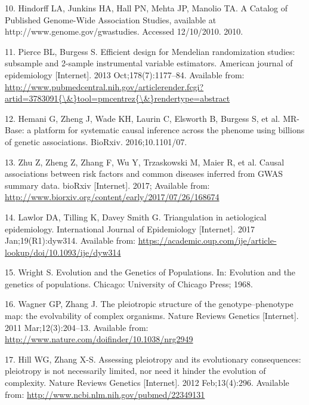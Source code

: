 \documentclass[]{article}
\begin{document}
\hypertarget{ref-Hindorff2010}{}
10. Hindorff LA, Junkins HA, Hall PN, Mehta JP, Manolio TA. A Catalog of
Published Genome-Wide Association Studies, available at
http://www.genome.gov/gwastudies. Accessed 12/10/2010. 2010.

\hypertarget{ref-Pierce2013}{}
11. Pierce BL, Burgess S. Efficient design for Mendelian randomization
studies: subsample and 2-sample instrumental variable estimators.
American journal of epidemiology {[}Internet{]}. 2013
Oct;178(7):1177--84. Available from:
\href{http://www.pubmedcentral.nih.gov/articlerender.fcgi?artid=3783091\%7B/\&\%7Dtool=pmcentrez\%7B/\&\%7Drendertype=abstract}{http://www.pubmedcentral.nih.gov/articlerender.fcgi?artid=3783091\{\textbackslash{}\&\}tool=pmcentrez\{\textbackslash{}\&\}rendertype=abstract}

\hypertarget{ref-Hemani2016}{}
12. Hemani G, Zheng J, Wade KH, Laurin C, Elsworth B, Burgess S, et al.
MR-Base: a platform for systematic causal inference across the phenome
using billions of genetic associations. BioRxiv. 2016;10.1101/07.

\hypertarget{ref-Zhu2017}{}
13. Zhu Z, Zheng Z, Zhang F, Wu Y, Trzaskowski M, Maier R, et al. Causal
associations between risk factors and common diseases inferred from GWAS
summary data. bioRxiv {[}Internet{]}. 2017; Available from:
\url{http://www.biorxiv.org/content/early/2017/07/26/168674}

\hypertarget{ref-Lawlor2017}{}
14. Lawlor DA, Tilling K, Davey Smith G. Triangulation in aetiological
epidemiology. International Journal of Epidemiology {[}Internet{]}. 2017
Jan;19(R1):dyw314. Available from:
\url{https://academic.oup.com/ije/article-lookup/doi/10.1093/ije/dyw314}

\hypertarget{ref-Wright1968}{}
15. Wright S. Evolution and the Genetics of Populations. In: Evolution
and the genetics of populations. Chicago: University of Chicago Press;
1968.

\hypertarget{ref-Wagner2011}{}
16. Wagner GP, Zhang J. The pleiotropic structure of the
genotype--phenotype map: the evolvability of complex organisms. Nature
Reviews Genetics {[}Internet{]}. 2011 Mar;12(3):204--13. Available from:
\url{http://www.nature.com/doifinder/10.1038/nrg2949}

\hypertarget{ref-Hill2012a}{}
17. Hill WG, Zhang X-S. Assessing pleiotropy and its evolutionary
consequences: pleiotropy is not necessarily limited, nor need it hinder
the evolution of complexity. Nature Reviews Genetics {[}Internet{]}.
2012 Feb;13(4):296. Available from:
\url{http://www.ncbi.nlm.nih.gov/pubmed/22349131}
\end{document}
